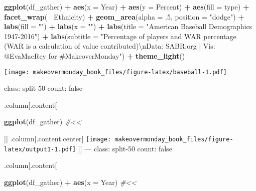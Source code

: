 \documentclass[]{book}
\newenvironment{Shaded}{\begin{snugshade}}{\end{snugshade}}
\newcommand{\KeywordTok}[1]{\textcolor[rgb]{0.13,0.29,0.53}{\textbf{#1}}}
\newcommand{\DataTypeTok}[1]{\textcolor[rgb]{0.13,0.29,0.53}{#1}}
\newcommand{\DecValTok}[1]{\textcolor[rgb]{0.00,0.00,0.81}{#1}}
\newcommand{\CharTok}[1]{\textcolor[rgb]{0.31,0.60,0.02}{#1}}
\newcommand{\StringTok}[1]{\textcolor[rgb]{0.31,0.60,0.02}{#1}}
\newcommand{\CommentTok}[1]{\textcolor[rgb]{0.56,0.35,0.01}{\textit{#1}}}
\newcommand{\OperatorTok}[1]{\textcolor[rgb]{0.81,0.36,0.00}{\textbf{#1}}}
\newcommand{\NormalTok}[1]{#1}
\theoremstyle{definition}
\theoremstyle{definition}
\theoremstyle{definition}
\theoremstyle{remark}
\begin{document}
\begin{Shaded}
\begin{Highlighting}[]
\KeywordTok{ggplot}\NormalTok{(df_gather) }\OperatorTok{+}
\StringTok{  }\KeywordTok{aes}\NormalTok{(}\DataTypeTok{x =}\NormalTok{ Year) }\OperatorTok{+}
\StringTok{  }\KeywordTok{aes}\NormalTok{(}\DataTypeTok{y =}\NormalTok{ Percent) }\OperatorTok{+}
\StringTok{  }\KeywordTok{aes}\NormalTok{(}\DataTypeTok{fill =}\NormalTok{ type) }\OperatorTok{+}
\StringTok{  }\KeywordTok{facet_wrap}\NormalTok{(}\OperatorTok{~}\StringTok{ }\NormalTok{Ethnicity) }\OperatorTok{+}
\StringTok{  }\KeywordTok{geom_area}\NormalTok{(}\DataTypeTok{alpha =}\NormalTok{ .}\DecValTok{5}\NormalTok{, }\DataTypeTok{position =} \StringTok{"dodge"}\NormalTok{) }\OperatorTok{+}
\StringTok{  }\KeywordTok{labs}\NormalTok{(}\DataTypeTok{fill =} \StringTok{""}\NormalTok{) }\OperatorTok{+}
\StringTok{  }\KeywordTok{labs}\NormalTok{(}\DataTypeTok{x =} \StringTok{""}\NormalTok{) }\OperatorTok{+}
\StringTok{  }\KeywordTok{labs}\NormalTok{(}\DataTypeTok{title =} \StringTok{"American Baseball Demographics 1947-2016"}\NormalTok{) }\OperatorTok{+}
\StringTok{  }\KeywordTok{labs}\NormalTok{(}\DataTypeTok{subtitle =} \StringTok{"Percentage of players and WAR percentage (WAR is a calculation of value contributed)}\CharTok{\textbackslash{}n}\StringTok{Data: SABR.org | Vis: @EvaMaeRey for #MakeoverMonday"}\NormalTok{) }\OperatorTok{+}
\StringTok{  }\KeywordTok{theme_light}\NormalTok{() }
\end{Highlighting}
\end{Shaded}

\texttt{[image: makeovermonday\_book\_files/figure-latex/baseball-1.pdf]}

class: split-50 count: false

.column{[}.content{[}

\begin{Shaded}
\begin{Highlighting}[]
\KeywordTok{ggplot}\NormalTok{(df_gather)  }\CommentTok{#<<}
\end{Highlighting}
\end{Shaded}

{]}{]} .column{[}.content.center{[}
\texttt{[image: makeovermonday\_book\_files/figure-latex/output1-1.pdf]}
{]}{]} --- class: split-50 count: false

.column{[}.content{[}

\begin{Shaded}
\begin{Highlighting}[]
\KeywordTok{ggplot}\NormalTok{(df_gather) }\OperatorTok{+}
\StringTok{  }\KeywordTok{aes}\NormalTok{(}\DataTypeTok{x =}\NormalTok{ Year)  }\CommentTok{#<<}
\end{Highlighting}
\end{Shaded}
\end{document}
